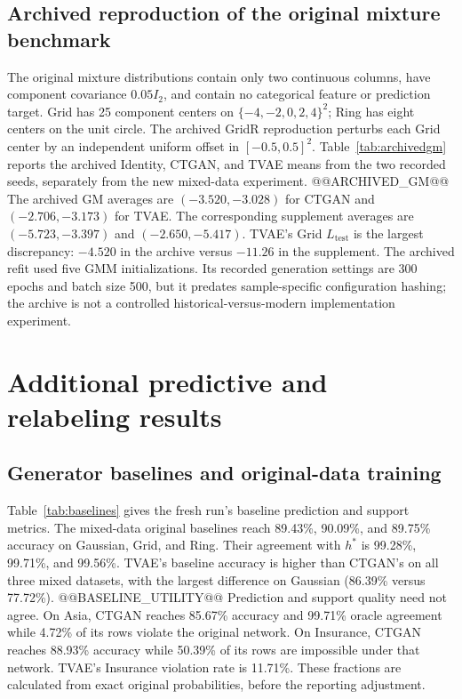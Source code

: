 \documentclass[11pt,letterpaper]{article}
\newcommand{\Ltest}{L_{\mathrm{test}}}
\begin{document}
\subsection{Archived reproduction of the original mixture benchmark}
The original mixture distributions contain only two continuous columns, have component covariance $0.05I_2$, and contain no categorical feature or prediction target. Grid has 25 component centers on $\{-4,-2,0,2,4\}^2$; Ring has eight centers on the unit circle. The archived GridR reproduction perturbs each Grid center by an independent uniform offset in $[-0.5,0.5]^2$. Table~\ref{tab:archivedgm} reports the archived Identity, CTGAN, and TVAE means from the two recorded seeds, separately from the new mixed-data experiment.
@@ARCHIVED_GM@@
The archived GM averages are $(-3.520,-3.028)$ for CTGAN and $(-2.706,-3.173)$ for TVAE. The corresponding supplement averages are $(-5.723,-3.397)$ and $(-2.650,-5.417)$. TVAE's Grid $\Ltest$ is the largest discrepancy: $-4.520$ in the archive versus $-11.26$ in the supplement. The archived refit used five GMM initializations. Its recorded generation settings are 300 epochs and batch size 500, but it predates sample-specific configuration hashing; the archive is not a controlled historical-versus-modern implementation experiment.

\section{Additional predictive and relabeling results}
\subsection{Generator baselines and original-data training}
Table~\ref{tab:baselines} gives the fresh run's baseline prediction and support metrics. The mixed-data original baselines reach 89.43\%, 90.09\%, and 89.75\% accuracy on Gaussian, Grid, and Ring. Their agreement with $h^*$ is 99.28\%, 99.71\%, and 99.56\%. TVAE's baseline accuracy is higher than CTGAN's on all three mixed datasets, with the largest difference on Gaussian (86.39\% versus 77.72\%).
@@BASELINE_UTILITY@@
Prediction and support quality need not agree. On Asia, CTGAN reaches 85.67\% accuracy and 99.71\% oracle agreement while 4.72\% of its rows violate the original network. On Insurance, CTGAN reaches 88.93\% accuracy while 50.39\% of its rows are impossible under that network. TVAE's Insurance violation rate is 11.71\%. These fractions are calculated from exact original probabilities, before the reporting adjustment.
\end{document}
